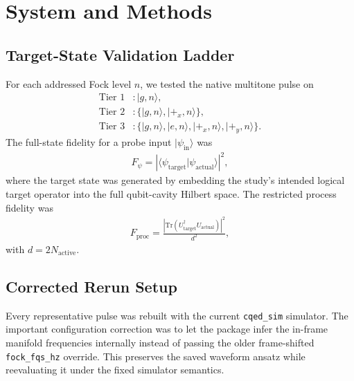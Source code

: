 \documentclass[aps,pra,twocolumn,reprint,amsmath,amssymb]{revtex4-2}
\begin{document}
\section{System and Methods}
\subsection{Target-State Validation Ladder}
For each addressed Fock level $n$, we tested the native multitone pulse on
\begin{align}
\text{Tier 1} &: |g,n\rangle, \\
\text{Tier 2} &: \{|g,n\rangle, |+_x,n\rangle\}, \\
\text{Tier 3} &: \{|g,n\rangle, |e,n\rangle, |+_x,n\rangle, |+_y,n\rangle\}.
\end{align}
The full-state fidelity for a probe input $|\psi_{\mathrm{in}}\rangle$ was
\begin{align}
F_\psi = \left|\langle \psi_{\mathrm{target}} | \psi_{\mathrm{actual}} \rangle\right|^2,
\end{align}
where the target state was generated by embedding the study's intended logical target operator into the full qubit-cavity Hilbert space. The restricted process fidelity was
\begin{align}
F_\mathrm{proc} = \frac{|\mathrm{Tr}(U_\mathrm{target}^\dagger U_\mathrm{actual})|^2}{d^2},
\end{align}
with $d=2N_{\mathrm{active}}$.

\subsection{Corrected Rerun Setup}
Every representative pulse was rebuilt with the current \texttt{cqed\_sim} simulator. The important configuration correction was to let the package infer the in-frame manifold frequencies internally instead of passing the older frame-shifted \texttt{fock\_fqs\_hz} override. This preserves the saved waveform ansatz while reevaluating it under the fixed simulator semantics.
\end{document}
